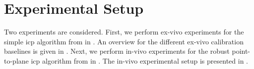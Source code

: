 


\section{Experimental Setup}
\label{c1:sec:experimental_setup}
Two experiments are considered. First, we perform ex-vivo experiments for the simple \acrshort{icp} algorithm from  in . An overview for the different ex-vivo calibration baselines is given in . Next, we perform in-vivo experiments for the robust point-to-plane \acrshort{icp} algorithm from  in . The in-vivo experimental setup is presented in .


